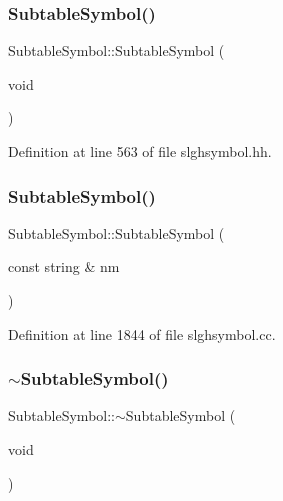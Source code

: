\subsubsection{\texorpdfstring{SubtableSymbol()}{SubtableSymbol()}\hspace{0.1cm}{\footnotesize\ttfamily [1/2]}}
{\footnotesize\ttfamily Subtable\+Symbol\+::\+Subtable\+Symbol (\begin{DoxyParamCaption}\item[{void}]{ }\end{DoxyParamCaption})\hspace{0.3cm}{\ttfamily [inline]}}



Definition at line 563 of file slghsymbol.\+hh.

\mbox{\label{class_subtable_symbol_a8fa634ec34377a831f5a8708ab667192}} 
\subsubsection{\texorpdfstring{SubtableSymbol()}{SubtableSymbol()}\hspace{0.1cm}{\footnotesize\ttfamily [2/2]}}
{\footnotesize\ttfamily Subtable\+Symbol\+::\+Subtable\+Symbol (\begin{DoxyParamCaption}\item[{const string \&}]{nm }\end{DoxyParamCaption})}



Definition at line 1844 of file slghsymbol.\+cc.

\mbox{\label{class_subtable_symbol_a9a5d482610a3dc3a3d1cf12e4b1caec3}} 
\subsubsection{\texorpdfstring{$\sim$SubtableSymbol()}{~SubtableSymbol()}}
{\footnotesize\ttfamily Subtable\+Symbol\+::$\sim$\+Subtable\+Symbol (\begin{DoxyParamCaption}\item[{void}]{ }\end{DoxyParamCaption})\hspace{0.3cm}{\ttfamily [virtual]}}



